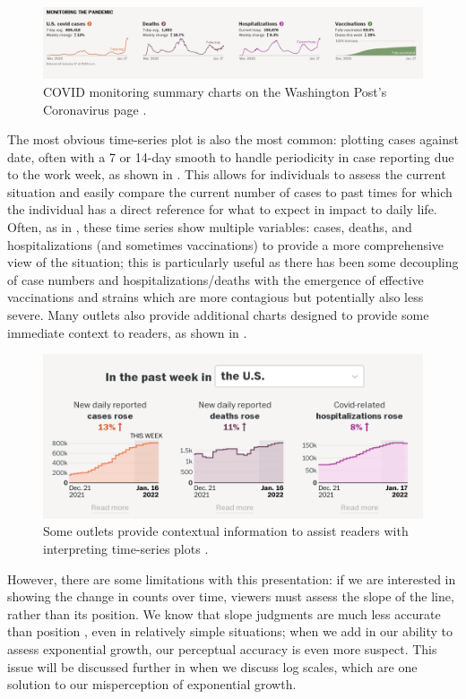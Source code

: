 \documentclass[article]{jdssv}\usepackage[]{graphicx}\usepackage[]{xcolor}
\begin{document}
\begin{figure}
\centering
\includegraphics[width=.99\linewidth]{wapo-COVID-monitoring}
\caption{COVID monitoring summary charts on the Washington Post's Coronavirus page \citep{Coronavirus2022}.}
\label{fig:wapo-COVID-time-series}
\end{figure}

The most obvious time-series plot is also the most common: plotting cases against date, often with a 7 or 14-day smooth to handle periodicity in case reporting due to the work week, as shown in . This allows for individuals to assess the current situation and easily compare the current number of cases to past times for which the individual has a direct reference for what to expect in impact to daily life. Often, as in , these time series show multiple variables: cases, deaths, and hospitalizations (and sometimes vaccinations) to provide a more comprehensive view of the situation; this is particularly useful as there has been some decoupling of case numbers and hospitalizations/deaths with the emergence of effective vaccinations and strains which are more contagious but potentially also less severe. Many outlets also provide additional charts designed to provide some immediate context to readers, as shown in . 

\begin{figure}
\centering
\includegraphics[width=.5\linewidth]{wapo-COVID-context}
\caption{Some outlets provide contextual information to assist readers with interpreting time-series plots \citep{CoronavirusCasesTracking2022}.}
\label{fig:wapo-context}
\end{figure}

However, there are some limitations with this presentation: if we are interested in showing the change in counts over time, viewers must assess the slope of the line, rather than its position. We know that slope judgments are much less accurate than position \citep{clevelandGraphicalPerceptionVisual1987}, even in relatively simple situations; when we add in our ability to assess exponential growth, our perceptual accuracy is even more suspect. This issue will be discussed further in  when we discuss log scales, which are one solution to our misperception of exponential growth.
\end{document}

